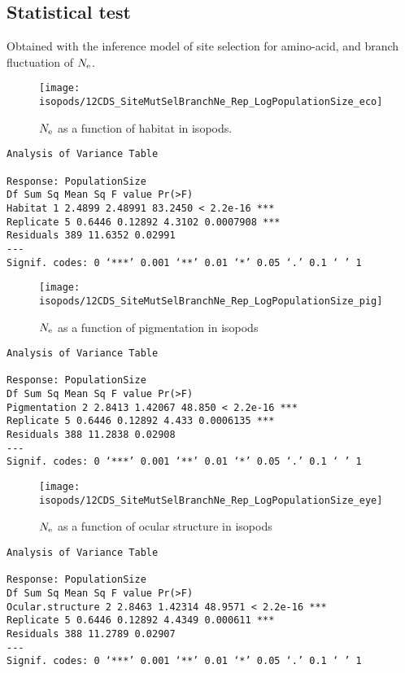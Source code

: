 \subsection{Statistical test}
Obtained with the inference model of site selection for amino-acid, and branch fluctuation of $\Ne$.

\begin{figure}[H]
    \centering
    \texttt{[image: isopods/12CDS\_SiteMutSelBranchNe\_Rep\_LogPopulationSize\_eco]}
    \caption[$\Ne$ as a function of habitat in isopods]{$\Ne$ as a function of habitat in isopods.}
\end{figure}
\begin{verbatim}
Analysis of Variance Table

Response: PopulationSize
Df Sum Sq Mean Sq F value Pr(>F) 
Habitat 1 2.4899 2.48991 83.2450 < 2.2e-16 ***
Replicate 5 0.6446 0.12892 4.3102 0.0007908 ***
Residuals 389 11.6352 0.02991 
---
Signif. codes: 0 ‘***’ 0.001 ‘**’ 0.01 ‘*’ 0.05 ‘.’ 0.1 ‘ ’ 1
\end{verbatim}
\begin{figure}[H]
    \centering
    \texttt{[image: isopods/12CDS\_SiteMutSelBranchNe\_Rep\_LogPopulationSize\_pig]}
    \caption[$\Ne$ as a function of pigmentation in isopods]{$\Ne$ as a function of pigmentation in isopods}
\end{figure}
\begin{verbatim}
Analysis of Variance Table

Response: PopulationSize
Df Sum Sq Mean Sq F value Pr(>F) 
Pigmentation 2 2.8413 1.42067 48.850 < 2.2e-16 ***
Replicate 5 0.6446 0.12892 4.433 0.0006135 ***
Residuals 388 11.2838 0.02908 
---
Signif. codes: 0 ‘***’ 0.001 ‘**’ 0.01 ‘*’ 0.05 ‘.’ 0.1 ‘ ’ 1
\end{verbatim}
\begin{figure}[H]
    \centering
    \texttt{[image: isopods/12CDS\_SiteMutSelBranchNe\_Rep\_LogPopulationSize\_eye]}
    \caption[$\Ne$ as a function of ocular structure in isopods]{$\Ne$ as a function of ocular structure in isopods}
\end{figure}
\begin{verbatim}
Analysis of Variance Table

Response: PopulationSize
Df Sum Sq Mean Sq F value Pr(>F) 
Ocular.structure 2 2.8463 1.42314 48.9571 < 2.2e-16 ***
Replicate 5 0.6446 0.12892 4.4349 0.000611 ***
Residuals 388 11.2789 0.02907 
---
Signif. codes: 0 ‘***’ 0.001 ‘**’ 0.01 ‘*’ 0.05 ‘.’ 0.1 ‘ ’ 1
\end{verbatim}
